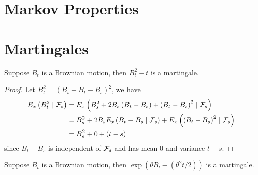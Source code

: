 \section{Markov Properties}

\section{Martingales}

\begin{example}
	Suppose \(B_{t}\) is a Brownian motion, then \(B_{t}^{2}-t\) is a martingale.
\end{example}

\begin{proof}
	Let \(B_{t}^{2}=\left(B_{s}+B_{t}-B_{s}\right)^{2}\), we have
	\begin{equation*}
		\begin{aligned}
			E_{x}\left(B_{t}^{2}\mid\mathcal{F}_{s}\right) & =E_{x}\left(B_{s}^{2}+2 B_{s}\left(B_{t}-B_{s}\right)+\left(B_{t}-B_{s}\right)^{2} \mid \mathcal{F}_{s}\right)                     \\
			                                        & =B_{s}^{2}+2 B_{s} E_{x}\left(B_{t}-B_{s} \mid \mathcal{F}_{s}\right)+E_{x}\left(\left(B_{t}-B_{s}\right)^{2} \mid \mathcal{F}_{s}\right) \\
			                                        & =B_{s}^{2}+0+(t-s)
		\end{aligned}
	\end{equation*}
	since \(B_{t}-B_{s}\) is independent of \(\mathcal{F}_{s}\) and has mean 0 and variance \(t-s\).
\end{proof}

\begin{example}
	Suppose \(B_{t}\) is a Brownian motion, then \(\exp\left(\theta B_{t}-\left(\theta^{2}t/2\right)\right)\) is a martingale.
\end{example}

